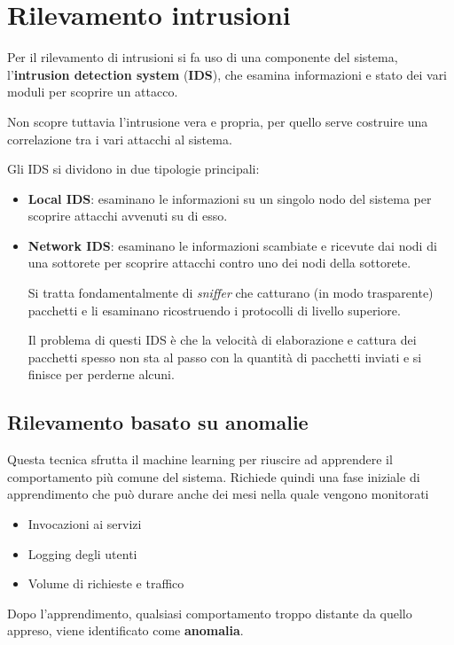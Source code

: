 \chapter{Rilevamento intrusioni}
Per il rilevamento di intrusioni si fa uso di una componente del sistema, l'\textbf{intrusion detection system}
(\textbf{IDS}), che esamina informazioni e stato dei vari moduli per scoprire un attacco.

Non scopre tuttavia l'intrusione vera e propria, per quello serve costruire una correlazione tra i vari attacchi al
sistema.

Gli IDS si dividono in due tipologie principali:
\begin{itemize}
	\item \textbf{Local IDS}: esaminano le informazioni su un singolo nodo del sistema per scoprire attacchi avvenuti
	      su di esso.
	\item \textbf{Network IDS}: esaminano le informazioni scambiate e ricevute dai nodi di una sottorete per scoprire
	      attacchi contro uno dei nodi della sottorete.

	      Si tratta fondamentalmente di \emph{sniffer} che catturano (in modo trasparente) pacchetti e li esaminano
	      ricostruendo i protocolli di livello superiore.

	      Il problema di questi IDS è che la velocità di elaborazione e cattura dei pacchetti spesso non sta al passo
	      con la quantità di pacchetti inviati e si finisce per perderne alcuni.
\end{itemize}

\section{Rilevamento basato su anomalie}
Questa tecnica sfrutta il machine learning per riuscire ad apprendere il comportamento più comune del sistema.
Richiede quindi una fase iniziale di apprendimento che può durare anche dei mesi nella quale vengono monitorati
\begin{itemize}
	\item Invocazioni ai servizi
	\item Logging degli utenti
	\item Volume di richieste e traffico
\end{itemize}
Dopo l'apprendimento, qualsiasi comportamento troppo distante da quello appreso, viene identificato come
\textbf{anomalia}.

